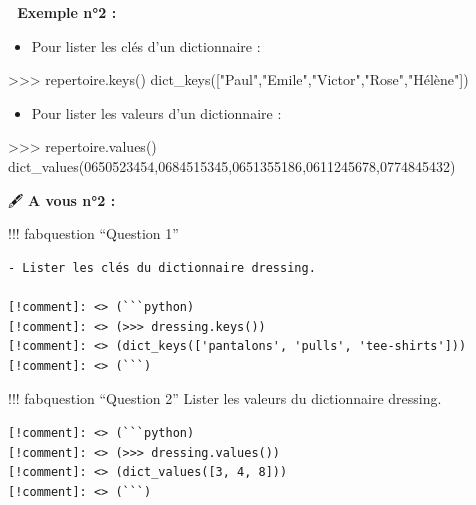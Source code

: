 \documentclass[
]{article}
\newenvironment{Shaded}{}{}
\newcommand{\NormalTok}[1]{#1}
\newcommand{\OperatorTok}[1]{\textcolor[rgb]{0.40,0.40,0.40}{#1}}
\newcommand{\StringTok}[1]{\textcolor[rgb]{0.25,0.44,0.63}{#1}}
\providecommand{\tightlist}{%
  \setlength{\itemsep}{0pt}\setlength{\parskip}{0pt}}
\begin{document}
\textbf{📎 Exemple n°2 :}

\begin{itemize}
\tightlist
\item
  Pour lister les clés d'un dictionnaire :
\end{itemize}

\begin{Shaded}
\begin{Highlighting}[]
\OperatorTok{\textgreater{}\textgreater{}\textgreater{}}\NormalTok{ repertoire.keys()}
\NormalTok{dict\_keys([}\StringTok{"Paul"}\NormalTok{,}\StringTok{"Emile"}\NormalTok{,}\StringTok{"Victor"}\NormalTok{,}\StringTok{"Rose"}\NormalTok{,}\StringTok{"Hélène"}\NormalTok{])}
\end{Highlighting}
\end{Shaded}

\begin{itemize}
\tightlist
\item
  Pour lister les valeurs d'un dictionnaire :
\end{itemize}

\begin{Shaded}
\begin{Highlighting}[]
\OperatorTok{\textgreater{}\textgreater{}\textgreater{}}\NormalTok{ repertoire.values()}
\NormalTok{dict\_values(}\StringTok{\textquotesingle{}0650523454\textquotesingle{}}\NormalTok{,}\StringTok{\textquotesingle{}0684515345\textquotesingle{}}\NormalTok{,}\StringTok{\textquotesingle{}0651355186\textquotesingle{}}\NormalTok{,}\StringTok{\textquotesingle{}0611245678\textquotesingle{}}\NormalTok{,}\StringTok{\textquotesingle{}0774845432\textquotesingle{}}\NormalTok{)}
\end{Highlighting}
\end{Shaded}

🖋 \textbf{A vous n°2 :}

!!! fabquestion ``Question 1''

\begin{verbatim}
- Lister les clés du dictionnaire dressing.

[!comment]: <> (```python)
[!comment]: <> (>>> dressing.keys())
[!comment]: <> (dict_keys(['pantalons', 'pulls', 'tee-shirts']))
[!comment]: <> (```)
\end{verbatim}

!!! fabquestion ``Question 2'' Lister les valeurs du dictionnaire
dressing.

\begin{verbatim}
[!comment]: <> (```python)
[!comment]: <> (>>> dressing.values())
[!comment]: <> (dict_values([3, 4, 8]))
[!comment]: <> (```)
\end{verbatim}
\end{document}
